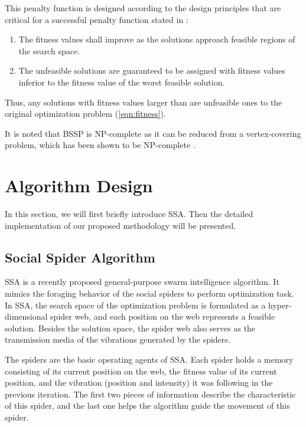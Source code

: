 \documentclass[conference]{IEEEtran}
\begin{document}
This penalty function is designed according to the design principles that are critical for a successful penalty function stated in \cite{KhuriBackHeitkotter1994evolutionaryapproachto}:
\begin{enumerate}
\item The fitness values shall improve as the solutions approach feasible regions of the search space.
\item The unfeasible solutions are guaranteed to be assigned with fitness values inferior to the fitness value of the worst feasible solution.
\end{enumerate}
Thus, any solutions with fitness values larger than  are unfeasible ones to the original optimization problem (\ref{eqn:fitness}).

It is noted that BSSP is NP-complete as it can be reduced from a vertex-covering problem, which has been shown to be NP-complete \cite{Karp1972Reducibilityamongcombinatorial}.

\section{Algorithm Design}\label{sec:algorithm}

In this section, we will first briefly introduce SSA. Then the detailed implementation of our proposed methodology will be presented.

\subsection{Social Spider Algorithm}

SSA is a recently proposed general-purpose swarm intelligence algorithm. It mimics the foraging behavior of the social spiders to perform optimization task. In SSA, the search space of the optimization problem is formulated as a hyper-dimensional spider web, and each position on the web represents a feasible solution. Besides the solution space, the spider web also serves as the transmission media of the vibrations generated by the spiders.

The spiders are the basic operating agents of SSA. Each spider holds a memory consisting of its current position on the web, the fitness value of its current position, and the vibration (position and intensity) it was following in the previous iteration. The first two pieces of information describe the characteristic of this spider, and the last one helps the algorithm guide the movement of this spider.
\end{document}
